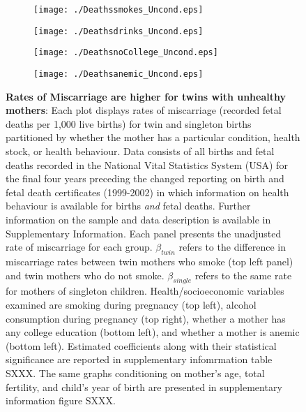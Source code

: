 \documentclass{nature}
\begin{document}
\begin{linenumbers}
\begin{spacing}{1}
\begin{figure}[htpb!]
\begin{subfigure}{.5\textwidth}
  \texttt{[image: ./Deathssmokes\_Uncond.eps]}
\end{subfigure}%
\begin{subfigure}{.5\textwidth}
  \texttt{[image: ./Deathsdrinks\_Uncond.eps]}
\end{subfigure}
\begin{subfigure}{.5\textwidth}
  \texttt{[image: ./DeathsnoCollege\_Uncond.eps]}
\end{subfigure}%
\begin{subfigure}{.5\textwidth}
  \texttt{[image: ./Deathsanemic\_Uncond.eps]}
\end{subfigure}
\vspace{5mm}
\caption{\textbf{Rates of Miscarriage are higher for twins with unhealthy mothers}: Each plot displays rates of miscarriage (recorded fetal deaths per 1,000 live births) for twin and singleton births partitioned by whether the mother has a particular condition, health stock, or health behaviour.  Data consists of all births and fetal deaths recorded in the National Vital Statistics System (USA) for the final four years preceding the changed reporting on birth and fetal death certificates (1999-2002) in which information on health behaviour is available for births \emph{and} fetal deaths.  Further information on the sample and data description is available in Supplementary Information.  Each panel presents the unadjusted rate of miscarriage for each group.  $\beta_{twin}$ refers to the difference in miscarriage rates between twin mothers who smoke (top left panel) and twin mothers who do not smoke. $\beta_{single}$ refers to the same rate for mothers of singleton children.  Health/socioeconomic variables examined are smoking during pregnancy (top left), alcohol consumption during pregnancy (top right), whether a mother has any college education (bottom left), and whether a mother is anemic (bottom left).  Estimated coefficients along with their statistical significance are reported in supplementary infomrmation table SXXX.  The same graphs conditioning on mother's age, total fertility, and child's year of birth are presented in supplementary information figure SXXX.}
\label{fig:mech}
\end{figure}
\end{spacing}

\clearpage



\end{linenumbers}
\end{document}
